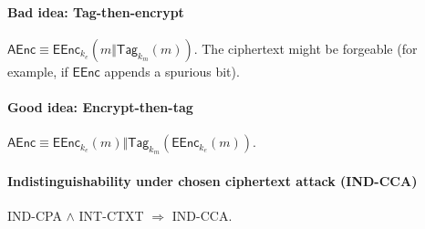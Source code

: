 \documentclass[11pt]{article}
\newcommand{\eqdef}{\ensuremath{\equiv}}
\newcommand{\AEnc}{\ensuremath{\mathsf{AEnc}}}
\newcommand{\EEnc}{\ensuremath{\mathsf{EEnc}}}
\newcommand{\Tag}{\ensuremath{\mathsf{Tag}}}
\theoremstyle{remark}
\begin{document}
\paragraph{Bad idea: Tag-then-encrypt}
$\AEnc \eqdef \EEnc_{k_e}( m \Vert \Tag_{k_m}(m) )$.
The ciphertext might be forgeable (for example,
if $\EEnc$ appends a spurious bit).

\paragraph{Good idea: Encrypt-then-tag}
$\AEnc \eqdef \EEnc_{k_e}(m) \Vert \Tag_{k_m}(\EEnc_{k_e}(m))$.

\paragraph{Indistinguishability under chosen ciphertext attack (IND-CCA)}
IND-CPA $\wedge$ INT-CTXT $\Rightarrow$ IND-CCA.
\end{document}
